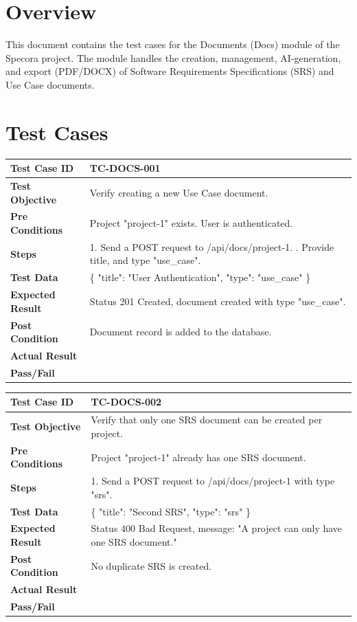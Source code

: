 \section{Overview}
This document contains the test cases for the Documents (Docs) module of the Specora project. The module handles the creation, management, AI-generation, and export (PDF/DOCX) of Software Requirements Specifications (SRS) and Use Case documents.

\section{Test Cases}

\begin{longtable}{|p{}|p{}|}
\hline
\textbf{Test Case ID} & TC-DOCS-001 \\ \hline
\textbf{Test Objective} & Verify creating a new Use Case document. \\ \hline
\textbf{Pre Conditions} & Project "project-1" exists. User is authenticated. \\ \hline
\textbf{Steps} & 
1. Send a POST request to /api/docs/project-1. \newline
2. Provide title, and type "use_case". \\ \hline
\textbf{Test Data} & \{ "title": "User Authentication", "type": "use\_case" \} \\ \hline
\textbf{Expected Result} & Status 201 Created, document created with type "use\_case". \\ \hline
\textbf{Post Condition} & Document record is added to the database. \\ \hline
\textbf{Actual Result} &  \\ \hline
\textbf{Pass/Fail} &  \\ \hline
\end{longtable}

\begin{longtable}{|p{}|p{}|}
\hline
\textbf{Test Case ID} & TC-DOCS-002 \\ \hline
\textbf{Test Objective} & Verify that only one SRS document can be created per project. \\ \hline
\textbf{Pre Conditions} & Project "project-1" already has one SRS document. \\ \hline
\textbf{Steps} & 
1. Send a POST request to /api/docs/project-1 with type "srs". \\ \hline
\textbf{Test Data} & \{ "title": "Second SRS", "type": "srs" \} \\ \hline
\textbf{Expected Result} & Status 400 Bad Request, message: "A project can only have one SRS document." \\ \hline
\textbf{Post Condition} & No duplicate SRS is created. \\ \hline
\textbf{Actual Result} &  \\ \hline
\textbf{Pass/Fail} &  \\ \hline
\end{longtable}

